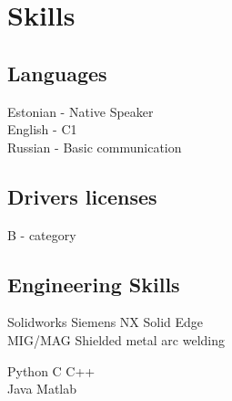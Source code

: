 \documentclass[letterpaper]{deedy-resume} %
\begin{document}
\begin{minipage}[t]{0.33\textwidth}

\section{Skills}

\subsection{Languages}

Estonian - Native Speaker \\
English - C1 \\
Russian - Basic communication \\

\sectionspace %


\subsection{Drivers licenses}

B - category \\

\sectionspace %

\subsection{Engineering Skills}

\sectionspace

Solidworks \textbullet{} Siemens NX \textbullet{} Solid Edge \\
MIG/MAG \textbullet{} Shielded metal arc welding \\

\sectionspace


\sectionspace

Python \textbullet{} C \textbullet{} C++ \\
Java \textbullet{} Matlab


\sectionspace %


\end{minipage} %
\end{document}
